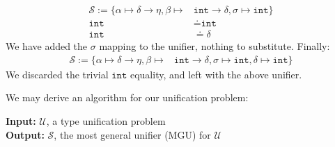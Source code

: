 \begin{Example}
    \begin{align*}
        \mathcal{S} := \{\alpha \mapsto \delta \to \eta, \beta \mapsto &\texttt{int} \to \delta, \sigma \mapsto \texttt{int}\}\\
        \texttt{int} &\doteq \texttt{int}\\
        \texttt{int} &\doteq \delta
    \end{align*}
    \noindent
    We have added the $\sigma$ mapping to the unifier, nothing to substitute. Finally:
    \begin{align*}
        \mathcal{S} := \{\alpha \mapsto \delta \to \eta, \beta \mapsto &\texttt{int} \to \delta, \sigma \mapsto \texttt{int},\delta \mapsto \texttt{int}\}
    \end{align*}
    \noindent
    We discarded the trivial $\texttt{int}$ equality, and left with the above unifier.
\end{Example}

\newpage 

\noindent
We may derive an algorithm for our unification problem:
\begin{Func}
    \noindent
    \textbf{Input:} $\mathcal{U}$, a type unification problem \\
    \textbf{Output:} $\mathcal{S}$, the most general unifier (MGU) for $\mathcal{U}$ \\

    \vspace{-.5em}
    \begin{algorithm}[H]
        \SetAlgoLined
    \end{algorithm}
\end{Func}

